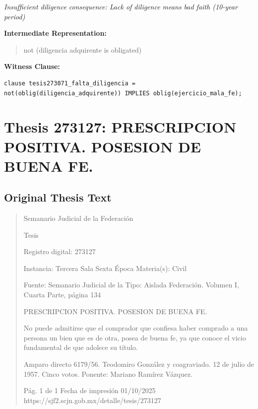 \documentclass[11pt,a4paper]{article}
\begin{document}
\textit{Insufficient diligence consequence: Lack of diligence means bad faith (10-year period)}

\textbf{Intermediate Representation:}

\begin{quote}
not (diligencia adquirente is obligated)
\end{quote}

\textbf{Witness Clause:}

\begin{lstlisting}[style=witnessstyle, language=Witness]
clause tesis273071_falta_diligencia = not(oblig(diligencia_adquirente)) IMPLIES oblig(ejercicio_mala_fe);
\end{lstlisting}

\newpage

\section{Thesis 273127: PRESCRIPCION POSITIVA. POSESION DE BUENA FE.}
\label{thesis:273127}

\subsection{Original Thesis Text}

\begin{quote}
                                                   Semanario Judicial de la Federación

                                                  Tesis

 Registro digital: 273127

 Instancia: Tercera Sala          Sexta Época                         Materia(s): Civil

                                  Fuente: Semanario Judicial de la    Tipo: Aislada
                                  Federación.
                                  Volumen I, Cuarta Parte, página 134


PRESCRIPCION POSITIVA. POSESION DE BUENA FE.


No puede admitirse que el comprador que confiesa haber comprado a una persona un bien que es
de otra, posea de buena fe, ya que conoce el vicio fundamental de que adolece su título.


Amparo directo 6179/56. Teodomiro González y coagraviado. 12 de julio de 1957. Cinco votos.
Ponente: Mariano Ramírez Vázquez.




                                             Pág. 1 de 1           Fecha de impresión 01/10/2025
  https://sjf2.scjn.gob.mx/detalle/tesis/273127

\end{quote}
\end{document}
